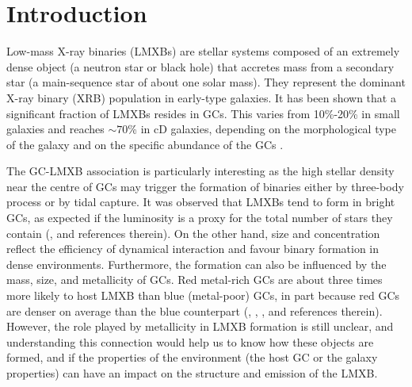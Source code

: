 \documentclass{aa}
\begin{document}
   {}

    
   \maketitle
    
\section{Introduction}
\label{sec:Introduction}
Low-mass X-ray binaries (LMXBs) are stellar systems composed of an extremely dense object (a neutron star or black hole) that accretes mass from a secondary star (a main-sequence star of about one solar mass). They represent the dominant X-ray binary (XRB) population in early-type galaxies. It has been shown that a significant fraction of LMXBs resides in GCs. This varies from 10\%-20\% in small galaxies and reaches $\sim 70$\% in cD galaxies, depending on the morphological type of the galaxy and on the specific abundance of the GCs \cite[e.g.][]{Kim2009}.

The GC-LMXB association is particularly interesting as the high stellar density near the centre of GCs may trigger the formation of binaries either by three-body process or by tidal capture. It was observed that LMXBs tend to form in bright GCs, as expected if the luminosity is a proxy for the total number of stars they contain (\citealt{Fabbiano2006}, and references therein). On the other hand, size and concentration reflect the efficiency of dynamical interaction and favour binary formation in dense environments. Furthermore, the formation can also be influenced by the mass, size, and metallicity of GCs. Red metal-rich GCs are $\text{about three}$ times more likely to host LMXB than blue (metal-poor) GCs, in part because red GCs are denser on average than the blue counterpart (\citealt{Jordan2004}, \citealt{Fabbiano2006}, \citealt{Paolillo2011}, \citealt{D'Ago2014} and references therein). However, the role played by metallicity in LMXB formation is still unclear, and understanding this connection would help us to know how these objects are formed, and if the properties of the environment (the host GC or the galaxy properties) can have an impact on the structure and emission of the LMXB.
\end{document}
